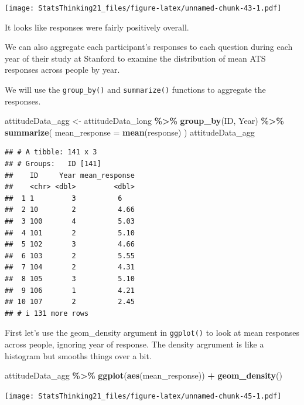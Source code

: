 \documentclass[
  12pt,
]{book}
\newenvironment{Shaded}{\begin{snugshade}}{\end{snugshade}}
\newcommand{\AttributeTok}[1]{\textcolor[rgb]{0.13,0.29,0.53}{#1}}
\newcommand{\FunctionTok}[1]{\textcolor[rgb]{0.13,0.29,0.53}{\textbf{#1}}}
\newcommand{\NormalTok}[1]{#1}
\newcommand{\OtherTok}[1]{\textcolor[rgb]{0.56,0.35,0.01}{#1}}
\newcommand{\SpecialCharTok}[1]{\textcolor[rgb]{0.81,0.36,0.00}{\textbf{#1}}}
\begin{document}
\texttt{[image: StatsThinking21\_files/figure-latex/unnamed-chunk-43-1.pdf]}

It looks like responses were fairly positively overall.

We can also aggregate each participant's responses to each question during each year of their study at Stanford to examine the distribution of mean ATS responses across people by year.

We will use the \texttt{group\_by()} and \texttt{summarize()} functions to aggregate the responses.

\begin{Shaded}
\begin{Highlighting}[]
\NormalTok{attitudeData\_agg }\OtherTok{\textless{}{-}}
\NormalTok{  attitudeData\_long }\SpecialCharTok{\%\textgreater{}\%} 
  \FunctionTok{group\_by}\NormalTok{(ID, Year) }\SpecialCharTok{\%\textgreater{}\%}
  \FunctionTok{summarize}\NormalTok{(}
    \AttributeTok{mean\_response =} \FunctionTok{mean}\NormalTok{(response)}
\NormalTok{  )}
\NormalTok{attitudeData\_agg}
\end{Highlighting}
\end{Shaded}

\begin{verbatim}
## # A tibble: 141 x 3
## # Groups:   ID [141]
##    ID     Year mean_response
##    <chr> <dbl>         <dbl>
##  1 1         3          6   
##  2 10        2          4.66
##  3 100       4          5.03
##  4 101       2          5.10
##  5 102       3          4.66
##  6 103       2          5.55
##  7 104       2          4.31
##  8 105       3          5.10
##  9 106       1          4.21
## 10 107       2          2.45
## # i 131 more rows
\end{verbatim}

First let's use the geom\_density argument in \texttt{ggplot()} to look at mean responses across people, ignoring year of response. The density argrument is like a histogram but smooths things over a bit.

\begin{Shaded}
\begin{Highlighting}[]
\NormalTok{attitudeData\_agg }\SpecialCharTok{\%\textgreater{}\%} 
  \FunctionTok{ggplot}\NormalTok{(}\FunctionTok{aes}\NormalTok{(mean\_response)) }\SpecialCharTok{+}
  \FunctionTok{geom\_density}\NormalTok{()}
\end{Highlighting}
\end{Shaded}

\texttt{[image: StatsThinking21\_files/figure-latex/unnamed-chunk-45-1.pdf]}
\end{document}
